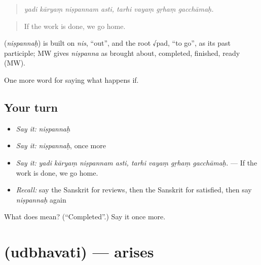 \begin{quote}
\emph{yadi kāryaṃ niṣpannam asti, tarhi vayaṃ gṛhaṃ gacchāmaḥ.}
\end{quote}

\begin{quote}
If the work is done, we go home.
\end{quote}

\begin{cousinweb}
\textbf{} (\emph{niṣpannaḥ}) is built on \emph{nis}, \textquotedblleft{}out\textquotedblright{}, and the root √pad, \textquotedblleft{}to go\textquotedblright{}, as its past participle; MW gives \emph{niṣpanna} as brought about, completed, finished, ready (MW).
\end{cousinweb}

\begin{grammarlens}[title={What you've built}]
One more word for saying what happens if.
\end{grammarlens}

\subsection*{Your turn}
\begin{itemize}
\raggedright
  \item \emph{Say it:} \emph{niṣpannaḥ}
  \item \emph{Say it:} \emph{niṣpannaḥ}, once more
  \item \emph{Say it:} \emph{yadi kāryaṃ niṣpannam asti, tarhi vayaṃ gṛhaṃ gacchāmaḥ.} — If the work is done, we go home.
  \item \emph{Recall:} say the Sanskrit for reviews, then the Sanskrit for satisfied, then say \emph{niṣpannaḥ} again
\end{itemize}

\begin{tcolorbox}[breakable,colback=teal!4,colframe=teal!35!black,title={Before you move on}]
What does  mean? (\textquotedblleft{}Completed\textquotedblright{}.) Say it once more.
\end{tcolorbox}
\section[\texorpdfstring{\sk{उद्भवति} (udbhavati)}{उद्भवति (udbhavati)}]{ (udbhavati) — arises}

\label{lesson:SA-C546-udbhavati}




